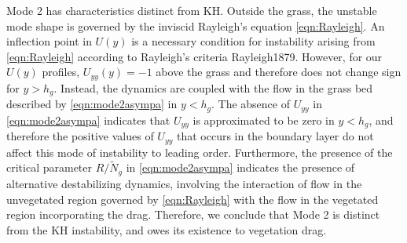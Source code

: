 \documentclass[12pt]{report}   %
\newcommand{\hg}{h_g}
\newcommand{\Rey}{{R}}
\newcommand{\Ndg}{\tilde{N}_g}
\begin{document}
Mode 2 has characteristics distinct from KH. Outside the grass, the unstable mode shape is governed by the inviscid Rayleigh's equation \eqref{eqn:Rayleigh}.
An inflection point in $U(y)$ is a necessary condition for instability arising from \eqref{eqn:Rayleigh} according to Rayleigh's criteria {Rayleigh1879}. 
However, for our $U(y)$ profiles, $U_{yy}(y) = -1$ above the grass and therefore does not change sign for $y>\hg$. 
Instead, the dynamics are coupled with the flow in the grass bed described by \eqref{eqn:mode2asympa} in $y< \hg$.
The absence of $U_{yy}$ in \eqref{eqn:mode2asympa} indicates that $U_{yy}$ is approximated to be zero in $y<\hg$, and therefore the positive values of $U_{yy}$ that occurs in the boundary layer do not affect this mode of instability to leading order.
Furthermore, the presence of the critical parameter $\Rey/\Ndg$ in \eqref{eqn:mode2asympa} indicates the presence of alternative destabilizing dynamics, involving the interaction of flow in the unvegetated region governed by \eqref{eqn:Rayleigh} with the flow in the vegetated region incorporating the drag.
Therefore, we conclude that Mode 2 is distinct from the KH instability, and owes its existence to vegetation drag.
\end{document}
